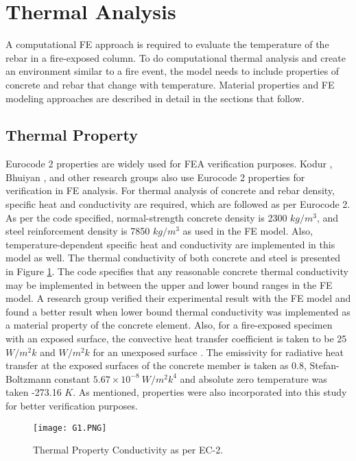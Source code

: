 \documentclass[12pt, letterpaper, oneside]{report}
\begin{document}
\section{Thermal Analysis}
A computational FE approach is required to evaluate the temperature of the rebar in a fire-exposed column. To do computational thermal analysis and create an environment similar to a fire event, the model needs to include properties of concrete and rebar that change with temperature. Material properties and FE modeling approaches are described in detail in the sections that follow.

\subsection{Thermal Property}
Eurocode 2 \cite{R10} properties are widely used for FEA verification purposes. Kodur \cite{R4, R5, R11}, Bhuiyan \cite{R1}, and other research groups also use Eurocode 2 properties for verification in FE analysis. For thermal analysis of concrete and rebar density, specific heat and conductivity are required, which are followed as per Eurocode 2. As per the code specified, normal-strength concrete density is 2300 \(kg/m^3\), and steel reinforcement density is 7850 \(kg/m^3\) as used in the FE model. Also, temperature-dependent specific heat and conductivity are implemented in this model as well. The thermal conductivity of both concrete and steel is presented in Figure \ref{fig:2}. The code specifies that any reasonable concrete thermal conductivity may be implemented in between the upper and lower bound ranges in the FE model. A research group verified their experimental result with the FE model and found a better result when lower bound thermal conductivity was implemented as a material property of the concrete element. Also, for a fire-exposed specimen with an exposed surface, the convective heat transfer coefficient is taken to be 25 \(W/m^2k\) \cite{R10} and \(W/m^2k\) for an unexposed surface \cite{R13}. The emissivity for radiative heat transfer at the exposed surfaces of the concrete member is taken as 0.8, Stefan-Boltzmann constant \(5.67\times{10}^{-8}\ W/m^{2}k^{4}\) and absolute zero temperature was taken -273.16 \(K\). As mentioned, properties were also incorporated into this study for better verification purposes.
\begin{figure}
    \centering
    \texttt{[image: G1.PNG]}
    \caption{Thermal Property Conductivity as per EC-2. \cite{R10}}
    \label{fig:2}
\end{figure}
\end{document}
